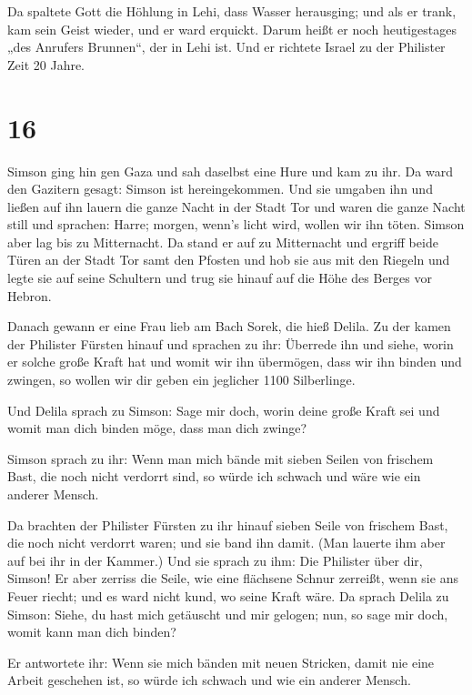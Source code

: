  Da spaltete Gott die Höhlung in Lehi, dass Wasser
herausging; und als er trank, kam sein Geist wieder, und er ward
erquickt. Darum heißt er noch heutigestages „des Anrufers Brunnen``, der
in Lehi ist.  Und er richtete Israel zu der Philister
Zeit 20 Jahre.

\hypertarget{section-15}{%
\section{16}\label{section-15}}

 Simson ging hin gen Gaza und sah daselbst eine Hure und
kam zu ihr.  Da ward den Gazitern gesagt: Simson ist
hereingekommen. Und sie umgaben ihn und ließen auf ihn lauern die ganze
Nacht in der Stadt Tor und waren die ganze Nacht still und sprachen:
Harre; morgen, wenn's licht wird, wollen wir ihn töten. 
Simson aber lag bis zu Mitternacht. Da stand er auf zu Mitternacht und
ergriff beide Türen an der Stadt Tor samt den Pfosten und hob sie aus
mit den Riegeln und legte sie auf seine Schultern und trug sie hinauf
auf die Höhe des Berges vor Hebron.

 Danach gewann er eine Frau lieb am Bach Sorek, die hieß
Delila.  Zu der kamen der Philister Fürsten hinauf und
sprachen zu ihr: Überrede ihn und siehe, worin er solche große Kraft hat
und womit wir ihn übermögen, dass wir ihn binden und zwingen, so wollen
wir dir geben ein jeglicher 1100 Silberlinge.

 Und Delila sprach zu Simson: Sage mir doch, worin deine
große Kraft sei und womit man dich binden möge, dass man dich zwinge?

 Simson sprach zu ihr: Wenn man mich bände mit sieben
Seilen von frischem Bast, die noch nicht verdorrt sind, so würde ich
schwach und wäre wie ein anderer Mensch.

 Da brachten der Philister Fürsten zu ihr hinauf sieben
Seile von frischem Bast, die noch nicht verdorrt waren; und sie band ihn
damit.  (Man lauerte ihm aber auf bei ihr in der Kammer.)
Und sie sprach zu ihm: Die Philister über dir, Simson! Er aber zerriss
die Seile, wie eine flächsene Schnur zerreißt, wenn sie ans Feuer
riecht; und es ward nicht kund, wo seine Kraft wäre.  Da
sprach Delila zu Simson: Siehe, du hast mich getäuscht und mir gelogen;
nun, so sage mir doch, womit kann man dich binden?

 Er antwortete ihr: Wenn sie mich bänden mit neuen
Stricken, damit nie eine Arbeit geschehen ist, so würde ich schwach und
wie ein anderer Mensch.

